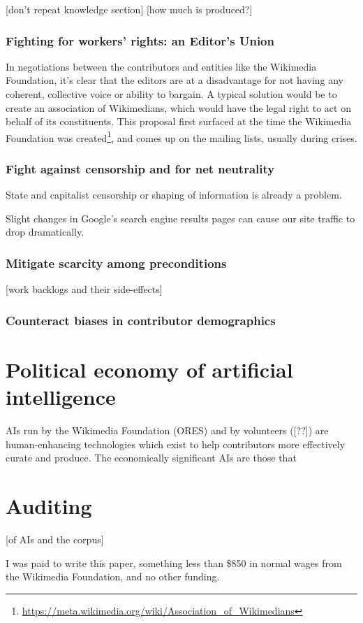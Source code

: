 \documentclass[format=sigconf, authorversion]{acmart}
\begin{document}
[don't repeat knowledge section]
[how much is produced?]

\subsubsection{Fighting for workers' rights: an Editor's Union}

In negotiations between the contributors and entities like the Wikimedia Foundation, it's clear that the editors are at a disadvantage for not having any coherent, collective voice or ability to bargain.  A typical solution would be to create an association of Wikimedians, which would have the legal right to act on behalf of its constituents.  This proposal first surfaced at the time the Wikimedia Foundation was created\footnote{\url{https://meta.wikimedia.org/wiki/Association_of_Wikimedians}}, and comes up on the mailing lists, usually during crises.

\subsubsection{Fight against censorship and for net neutrality}

State and capitalist censorship or shaping of information is already a problem.

Slight changes in Google's search engine results pages can cause our site traffic to drop dramatically.

\subsubsection{Mitigate scarcity among preconditions}

[work backlogs and their side-effects]

\subsubsection{Counteract biases in contributor demographics}

\section{Political economy of artificial intelligence}

AIs run by the Wikimedia Foundation (ORES) and by volunteers ([??]) are human-enhancing technologies which exist to help contributors more effectively curate and produce.  The economically significant AIs are those that 

\section{Auditing}

[of AIs and the corpus]

\begin{acks}
I was paid to write this paper, something less than \$850 in normal wages from the Wikimedia Foundation, and no other funding.
\end{acks}


\end{document}
